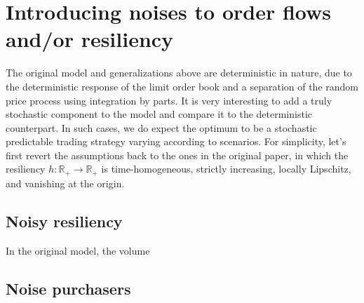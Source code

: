 \documentclass[openany,oneside]{article}
\theoremstyle{definition}
\theoremstyle{remark}
\begin{document}
\section{Introducing noises to order flows and/or resiliency}
The original model and generalizations above are deterministic in nature, due to the deterministic response of the limit order book and a separation of the random price process using integration by parts. It is very interesting to add a truly stochastic component to the model and compare it to the deterministic counterpart. In such cases, we do expect the optimum to be a stochastic predictable trading strategy varying according to scenarios. For simplicity, let's first revert the assumptions back to the ones in the original paper, in which the resiliency $h:\mathbb{R}_+ \to \mathbb{R}_+$ is time-homogeneous, strictly increasing, locally Lipschitz, and vanishing at the origin.

\subsection{Noisy resiliency}

In the original model, the volume 

{\color{red}
\subsection{Noise purchasers}
}




{}

\end{document}
